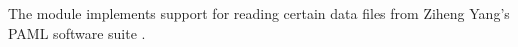 The  module implements support for reading certain data
files from Ziheng Yang's PAML software suite \citep{Yang97}.


